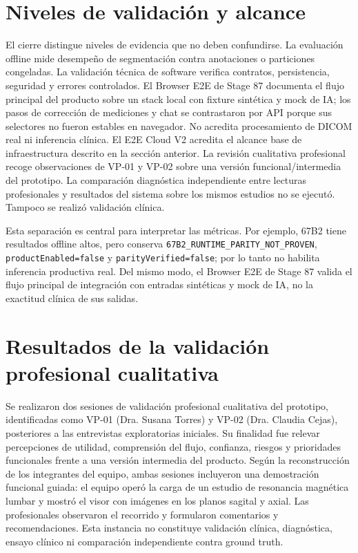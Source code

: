 \section{Niveles de validación y alcance}
\label{sec:resultados-niveles-validacion}

El cierre distingue niveles de evidencia que no deben confundirse. La evaluación offline mide desempeño de segmentación contra anotaciones o particiones congeladas. La validación técnica de software verifica contratos, persistencia, seguridad y errores controlados. El Browser E2E de Stage 87 documenta el flujo principal del producto sobre un stack local con fixture sintética y mock de IA; los pasos de corrección de mediciones y chat se contrastaron por API porque sus selectores no fueron estables en navegador. No acredita procesamiento de DICOM real ni inferencia clínica. El E2E Cloud V2 acredita el alcance base de infraestructura descrito en la sección anterior. La revisión cualitativa profesional recoge observaciones de VP-01 y VP-02 sobre una versión funcional/intermedia del prototipo. La comparación diagnóstica independiente entre lecturas profesionales y resultados del sistema sobre los mismos estudios no se ejecutó. Tampoco se realizó validación clínica.

Esta separación es central para interpretar las métricas. Por ejemplo, 67B2 tiene resultados offline altos, pero conserva \texttt{67B2\_RUNTIME\_PARITY\_NOT\_PROVEN}, \texttt{productEnabled=false} y \texttt{parityVerified=false}; por lo tanto no habilita inferencia productiva real. Del mismo modo, el Browser E2E de Stage 87 valida el flujo principal de integración con entradas sintéticas y mock de IA, no la exactitud clínica de sus salidas.
\section{Resultados de la validación profesional cualitativa}
\label{sec:resultados-validacion-profesional-cualitativa}

Se realizaron dos sesiones de validación profesional cualitativa del prototipo, identificadas como VP-01 (Dra. Susana Torres) y VP-02 (Dra. Claudia Cejas), posteriores a las entrevistas exploratorias iniciales. Su finalidad fue relevar percepciones de utilidad, comprensión del flujo, confianza, riesgos y prioridades funcionales frente a una versión intermedia del producto. Según la reconstrucción de los integrantes del equipo, ambas sesiones incluyeron una demostración funcional guiada: el equipo operó la carga de un estudio de resonancia magnética lumbar y mostró el visor con imágenes en los planos sagital y axial. Las profesionales observaron el recorrido y formularon comentarios y recomendaciones. Esta instancia no constituye validación clínica, diagnóstica, ensayo clínico ni comparación independiente contra ground truth.

